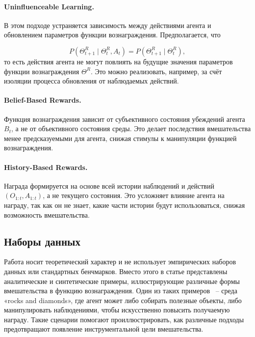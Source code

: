 \paragraph{Uninfluenceable Learning.} В этом подходе устраняется зависимость между действиями агента и обновлением параметров функции вознаграждения. Предполагается, что 

\begin{equation}
    P(\Theta^R_{t+1} \mid \Theta^R_t, A_t) = P(\Theta^R_{t+1} \mid \Theta^R_t),
\end{equation}
то есть действия агента не могут повлиять на будущие значения параметров функции вознаграждения $\Theta^R$. Это можно реализовать, например, за счёт изоляции процесса обновления от наблюдаемых действий.

\paragraph{Belief-Based Rewards.} Функция вознаграждения зависит от субъективного состояния убеждений агента $B_t$, а не от объективного состояния среды. Это делает последствия вмешательства менее предсказуемыми для агента, снижая стимулы к манипуляции функцией вознаграждения.

\paragraph{History-Based Rewards.} Награда формируется на основе всей истории наблюдений и действий $(O_{1:t}, A_{1:t})$, а не текущего состояния. Это усложняет влияние агента на награду, так как он не знает, какие части истории будут использоваться, снижая возможность вмешательства.

\subsection{Наборы данных}

Работа носит теоретический характер и не использует эмпирических наборов данных или стандартных бенчмарков. Вместо этого в статье представлены аналитические и синтетические примеры, иллюстрирующие различные формы вмешательства в функцию вознаграждения. Один из таких примеров ~-- среда «rocks and diamonds», где агент может либо собирать полезные объекты, либо манипулировать наблюдениями, чтобы искусственно повысить получаемую награду. Такие сценарии помогают проиллюстрировать, как различные подходы предотвращают появление инструментальной цели вмешательства.

